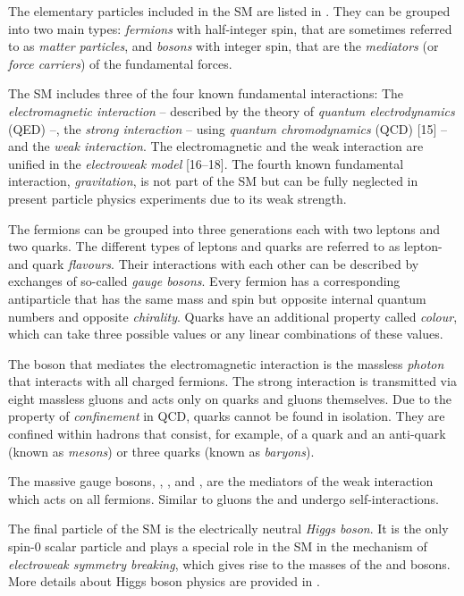 The elementary particles included in the SM are listed in . They can be grouped into two main types: \emph{fermions} with half-integer spin, that are sometimes referred to as \emph{matter particles}, and \emph{bosons} with integer spin, that are the \emph{mediators} (or \emph{force carriers}) of the fundamental forces.

The SM includes three of the four known fundamental interactions: The \emph{electromagnetic interaction} -- described by the theory of \emph{quantum electrodynamics} (QED) --, the \emph{strong interaction} -- using \emph{quantum chromodynamics} (QCD) [15] -- and the \emph{weak interaction}. The electromagnetic and the weak interaction are unified in the \emph{electroweak model} [16–18]. The fourth known fundamental interaction, \emph{gravitation}, is not part of the SM but can be fully neglected in present particle physics experiments due to its weak strength.

The fermions can be grouped into three generations each with two leptons and two quarks. The different types of leptons and quarks are referred to as lepton- and quark \emph{flavours}.
Their interactions with each other can be described by exchanges of so-called \emph{gauge bosons}.
Every fermion has a corresponding antiparticle that has the same mass and spin but opposite internal quantum numbers and opposite \emph{chirality}.
Quarks have an additional property called \emph{colour}, which can take three possible values or any linear combinations of these values.

The boson that mediates the electromagnetic interaction is the massless \emph{photon} that interacts with all charged fermions.
The strong interaction is transmitted via eight massless gluons and acts only on quarks and gluons themselves.
Due to the property of \emph{confinement} in QCD, quarks cannot be found in isolation. They are confined within hadrons that consist, for example, of a quark and an anti-quark (known as \emph{mesons}) or three quarks (known as \emph{baryons}).

The massive gauge bosons, \Wplus, \Wminus, and \Zboson, are the mediators of the weak interaction which acts on all fermions. Similar to gluons the \Wmp and \Zboson undergo self-interactions.

The final particle of the SM is the electrically neutral \emph{Higgs boson}. It is the only spin-0 scalar particle and plays a special role in the SM in the mechanism of \emph{electroweak symmetry breaking}, which gives rise to the masses of the \Wpm and \Zboson bosons. More details about Higgs boson physics are provided in .


